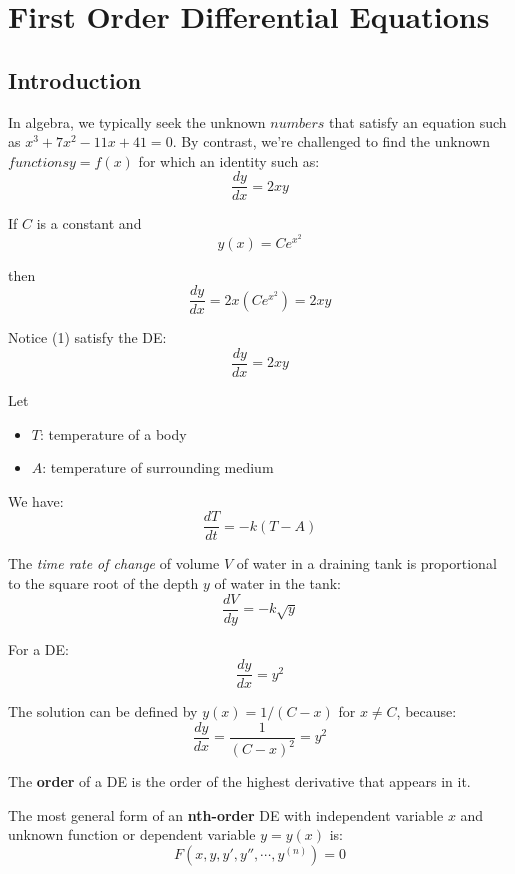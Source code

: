 \chapter{First Order Differential Equations}

\section{Introduction}

In algebra, we typically seek the unknown \(numbers\) that satisfy an equation such as \(x^3 + 7x^2 -11x +41 =0\). 
By contrast, we're challenged to find the unknown \(functions y = f(x)\) for which an identity such as:
\[
    \dfrac{dy}{dx} = 2xy
\] 

\begin{example}
    If \(C\) is a constant and 
    \[
        y(x) = Ce^{x^2}
    \] 

    then 
    \[
        \dfrac{dy}{dx} = 2x(Ce^{x^2}) = 2xy \tag{1}
    \]

    Notice (1) satisfy the DE:
    \[
        \dfrac{dy}{dx} = 2xy
    \]
\end{example}

\begin{example}
    Let
    \begin{itemize}
        \item \(T\): temperature of a body 
        \item \(A\): temperature of surrounding medium 
    \end{itemize}

    We have:
    \[
        \dfrac{dT}{dt} = -k(T - A)
    \]
\end{example}

\begin{example}
    The \textit{time rate of change} of volume \(V\) of water in a draining tank is proportional to the square root of the depth \(y\) of water in the tank:
    \[
        \dfrac{dV}{dy} = -k \sqrt{y}
    \]  
\end{example}

\begin{example}
    For a DE:
    \[
        \dfrac{dy}{dx} = y^2
    \]

    The solution can be defined by \(y(x) = 1/(C-x)\) for \(x \neq C\), because:
    \[
        \dfrac{dy}{dx} = \dfrac{1}{(C -x)^2} = y^2
    \]  
\end{example}

\begin{definition}[order]
    The \textbf{order} of a DE is the order of the highest derivative that appears in it. 

    The most general form of an \textbf{nth-order} DE with independent variable \(x\) and unknown function or dependent variable \(y = y(x)\) is:
    \[
        F(x, y, y', y'', \cdots, y^{(n)}) = 0
    \]
\end{definition}

